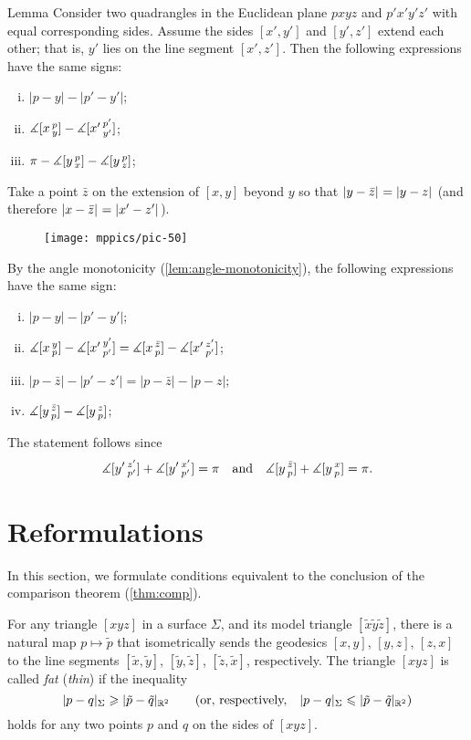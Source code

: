 \begin{thm}{Lemma}
\label{lem:alex}
Consider two quadrangles in the Euclidean plane $pxyz$ and $p'x'y'z'$ with equal corresponding sides.
Assume the sides $[x',y']$ and $[y',z']$ extend each other; that is, $y'$ lies on the line segment $[x',z']$.
Then the following expressions have the same signs:
\begin{enumerate}[(i)]
 \item $|p-y|-|p'-y'|$;
 \item $\measuredangle[x\,{}^{p}_{y}]-\measuredangle[x'\,{}^{p'}_{y'}]$;
 \item $\pi-\measuredangle[y\,{}^{p}_{x}]-\measuredangle[y\,{}^{p}_{z}]$;
\end{enumerate}
\end{thm}

Take 
a point $\bar z$ on the extension of 
$[x,y]$ beyond $y$ so that $\dist{y}{\bar z}{}=\dist{y}{z}{}$ (and therefore $\dist{x}{\bar z}{}=\dist{x'}{z'}{}$). 
 
\begin{figure}[!ht]
\vskip-0mm
\centering
\texttt{[image: mppics/pic-50]}
\vskip-0mm
\end{figure}

By the angle monotonicity (\ref{lem:angle-monotonicity}), 
the following expressions have the same sign:
\begin{enumerate}[(i)]
\item $|p-y|-|p'-y'|$;
\item $\measuredangle[x\,{}^{y}_{p}]-\measuredangle[x'\,{}^{y'}_{p'}]=\measuredangle[x\,{}^{\bar z}_{p}]-\measuredangle[x'\,{}^{z'}_{p'}]$;
\item $|p-\bar z|-|p'-z'| = | p - \bar z | - | p-z | $;
\item $\measuredangle[y\,{}^{\bar z}_{p}]-\measuredangle[y\,{}^{z}_{p}]$;
\end{enumerate}
The statement follows since
\[\measuredangle[y'\,{}^{z'}_{p'}]+\measuredangle[y'\,{}^{x'}_{p'}]=\pi
\quad\text{and}\quad
\measuredangle[y\,{}^{\bar z}_{p}]+\measuredangle[y\,{}^{x}_{p}]=\pi.\]
\qedsf

\section{Reformulations}

In this section, we formulate conditions equivalent to the conclusion of the comparison theorem (\ref{thm:comp}).

For any triangle $[xyz]$ in a surface $\Sigma$, and its model triangle $[\tilde x \tilde y \tilde z]$, there is a natural map $p\mapsto \tilde p$ that isometrically sends the geodesics $[x,y]$, $[y,z]$, $[z,x]$ to the line segments $[\tilde x,\tilde y ]$, $[\tilde y , \tilde z]$, $[ \tilde z , \tilde x ]$, respectively.
The triangle $[xyz]$ is called \emph{fat} (\emph{thin})
if the inequality
\[\dist{p}{q}{\Sigma}\ge |\tilde p- \tilde q|_{\mathbb{R}^2}\qquad \text{(or, respectively,}\quad \dist{p}{q}{\Sigma}\le |\tilde p- \tilde q|_{\mathbb{R}^2})\]
holds for any two points $p$ and $q$ on the sides of $[xyz]$.

